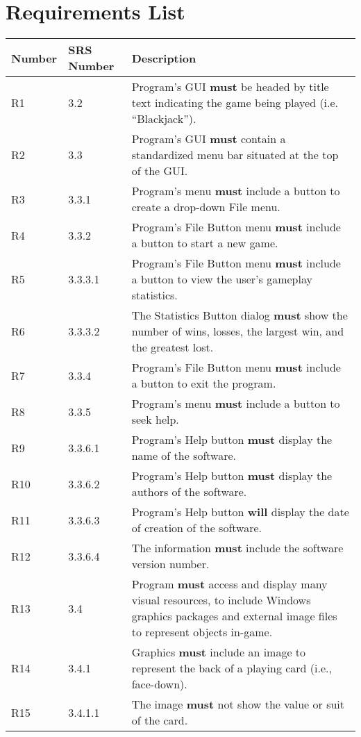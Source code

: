 \documentclass{article}
\newcounter{Requirement}
\begin{document}
\section{Requirements List}
\begin{tabular}{|l|l|p{5in}|}\hline
Number & SRS Number & Description\\\hline\hline
R1 & 3.2 & Program’s GUI \textbf{must} be headed by title text indicating the game being played (i.e. “Blackjack”). \\\hline
R2 & 3.3 & Program’s GUI \textbf{must} contain a standardized menu bar situated at the top of the GUI.   \\\hline
R3 & 3.3.1 & Program’s menu \textbf{must} include a button to create a drop-down File menu. \\\hline
R4 & 3.3.2 & Program’s File Button menu \textbf{must} include a button to start a new game. \\\hline
R5 & 3.3.3.1 & Program’s File Button menu \textbf{must} include a button to view the user’s gameplay statistics. \\\hline
R6 & 3.3.3.2 & The Statistics Button dialog \textbf{must} show the number of wins, losses, the largest win, and the greatest lost. \\\hline
R7 & 3.3.4 & Program’s File Button menu \textbf{must} include a button to exit the program. \\\hline
R8 & 3.3.5 & Program’s menu \textbf{must} include a button to seek help. \\\hline
R9 & 3.3.6.1 & Program’s Help button \textbf{must} display the name of the software. \\\hline
R10 & 3.3.6.2 & Program’s Help button \textbf{must} display the authors of the software. \\\hline
R11 & 3.3.6.3 & Program’s Help button \textbf{will} display the date of creation of the software. \\\hline
R12 & 3.3.6.4 & The information \textbf{must} include the software version number.  \\\hline
R13 & 3.4 & Program \textbf{must} access and display many visual resources, to include Windows graphics packages and external image files to represent objects in-game. \\\hline
R14 & 3.4.1 & Graphics \textbf{must} include an image to represent the back of a playing card (i.e., face-down).   \\\hline
R15 & 3.4.1.1 & The image \textbf{must} not show the value or suit of the card.   \\\hline

\end{tabular}
\end{document}
